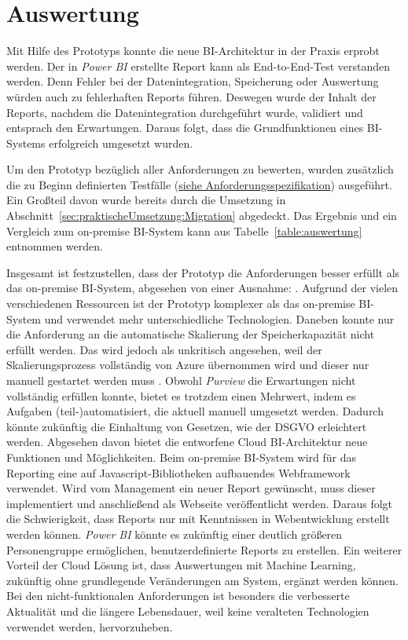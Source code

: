 \section{Auswertung} \label{sec:umsetzung:auswertung}
Mit Hilfe des Prototyps konnte die neue BI-Architektur in der Praxis erprobt werden. Der in \textit{Power BI} erstellte Report kann als End-to-End-Test verstanden werden. Denn Fehler bei der Datenintegration, Speicherung oder Auswertung würden auch zu fehlerhaften Reports führen. Deswegen wurde der Inhalt der Reports, nachdem die Datenintegration durchgeführt wurde, validiert und entsprach den Erwartungen. Daraus folgt, dass die Grundfunktionen eines BI-Systems erfolgreich umgesetzt wurden.

Um den Prototyp bezüglich aller Anforderungen zu bewerten, wurden zusätzlich die zu Beginn definierten Testfälle (\hyperref[sec:anforderungsspezifikation:funktionaleAnforderungen]{siehe Anforderungsspezifikation}) ausgeführt. Ein Großteil davon wurde bereits durch die Umsetzung in Abschnitt~\ref{sec:praktischeUmsetzung:Migration} abgedeckt. Das Ergebnis und ein Vergleich zum on-premise BI-System kann aus Tabelle~\ref{table:auswertung} entnommen werden. 



Insgesamt ist festzustellen, dass der Prototyp die Anforderungen besser erfüllt als das on-premise BI-System, abgesehen von einer Ausnahme: \textit{}. Aufgrund der vielen verschiedenen Ressourcen ist der Prototyp komplexer als das on-premise BI-System und verwendet mehr unterschiedliche Technologien. Daneben konnte nur die Anforderung an die automatische Skalierung der Speicherkapazität nicht erfüllt werden. Das wird jedoch als unkritisch angesehen, weil der Skalierungsprozess vollständig von Azure übernommen wird und dieser nur manuell gestartet werden muss \cite{reagan_web_2018}. Obwohl \textit{Purview} die Erwartungen nicht vollständig erfüllen konnte, bietet es trotzdem einen Mehrwert, indem es Aufgaben (teil-)automatisiert, die aktuell manuell umgesetzt werden. Dadurch könnte zukünftig die Einhaltung von Gesetzen, wie der DSGVO erleichtert werden. Abgesehen davon bietet die entworfene Cloud BI-Architektur neue Funktionen und Möglichkeiten. Beim on-premise BI-System wird für das Reporting eine auf Javascript-Bibliotheken aufbauendes Webframework verwendet. Wird vom Management ein neuer Report gewünscht, muss dieser implementiert und anschließend als Webseite veröffentlicht werden. Daraus folgt die Schwierigkeit, dass Reports nur mit Kenntnissen in Webentwicklung erstellt werden können. \textit{Power BI} könnte es zukünftig einer deutlich größeren Personengruppe ermöglichen, benutzerdefinierte Reports zu erstellen. Ein weiterer Vorteil der Cloud Lösung ist, dass Auswertungen mit Machine Learning, zukünftig ohne grundlegende Veränderungen am System, ergänzt werden können. Bei den nicht-funktionalen Anforderungen ist besonders die verbesserte Aktualität und die längere Lebensdauer, weil keine veralteten Technologien verwendet werden, hervorzuheben.